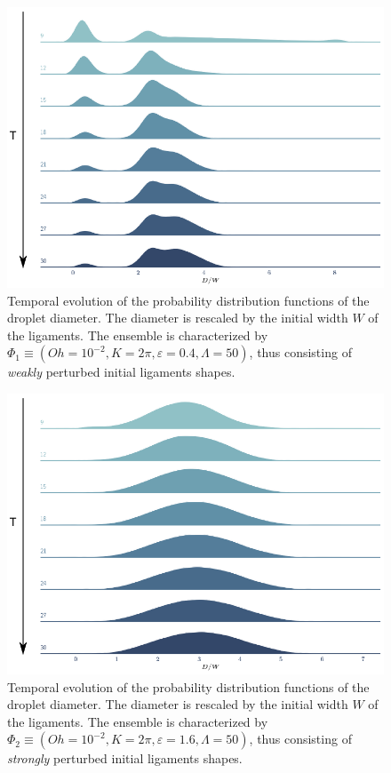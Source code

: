 
\begin{figure}
\centering
\includegraphics{plots/drop_stats/small_amp.pdf}
\caption{Temporal evolution of the probability distribution functions of the droplet diameter.
	The diameter is rescaled by the initial width $W$ of the ligaments.
	The ensemble is characterized by $\Phi_1 \equiv \left( Oh = 10^{-2}, K = 2\pi 
, \varepsilon = 0.4 , \Lambda = 50 \right)$, thus consisting of \textit{weakly} perturbed 
initial ligaments shapes. 
	}
\label{tseries_small}
\end{figure}

\begin{figure}
\centering
\includegraphics{plots/drop_stats/large_amp.pdf}
\caption{Temporal evolution of the probability distribution functions of the droplet diameter.
	The diameter is rescaled by the initial width $W$ of the ligaments.
	The ensemble is characterized by $\Phi_2 \equiv \left( Oh = 10^{-2}, K = 2\pi 
, \varepsilon = 1.6 , \Lambda = 50 \right)$, thus consisting of \textit{strongly} perturbed 
initial ligaments shapes. 
	}
\label{tseries_large}
\end{figure}

